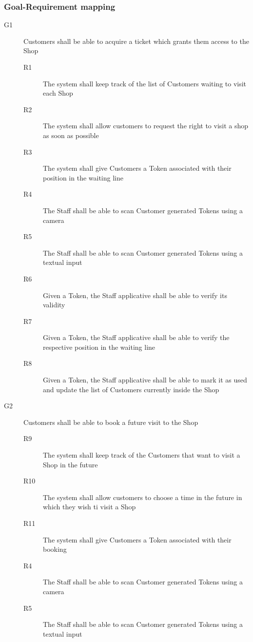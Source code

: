 \subsubsection{Goal-Requirement mapping}
\begin{description}
    \item [G1] Customers shall be able to acquire a ticket which grants them access to the Shop
          \begin{description}
              \item [R1] The system shall keep track of the list of Customers waiting to visit each Shop
              \item [R2] The system shall allow customers to request the right to visit a shop as soon as possible
              \item [R3] The system shall give Customers a Token associated with their position in the waiting line
              \item [R4] The Staff shall be able to scan Customer generated Tokens using a camera
              \item [R5] The Staff shall be able to scan Customer generated Tokens using a textual input
              \item [R6] Given a Token, the Staff applicative shall be able to verify its validity
              \item [R7] Given a Token, the Staff applicative shall be able to verify the respective position in the waiting line
              \item [R8] Given a Token, the Staff applicative shall be able to mark it as used and update the list of Customers currently inside the Shop
          \end{description}
    \item [G2]  Customers shall be able to book a future visit to the Shop
          \begin{description}
              \item [R9] The system shall keep track of the Customers that want to visit a Shop in the future
              \item [R10] The system shall allow customers to choose a time in the future in which they wish ti visit a Shop
              \item [R11] The system shall give Customers a Token associated with their booking
              \item [R4] The Staff shall be able to scan Customer generated Tokens using a camera
              \item [R5] The Staff shall be able to scan Customer generated Tokens using a textual input

\end{description}
\end{description}

